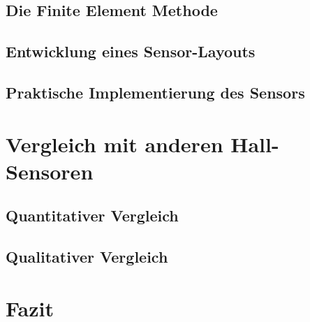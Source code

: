 \documentclass[12pt, a4paper]{article}
\begin{document}
\subsection{Die Finite Element Methode}

\subsection{Entwicklung eines Sensor-Layouts}

\subsection{Praktische Implementierung des Sensors}


\section{Vergleich mit anderen Hall-Sensoren}
\subsection{Quantitativer Vergleich}

\subsection{Qualitativer Vergleich}	

\section{Fazit}
\end{document}
